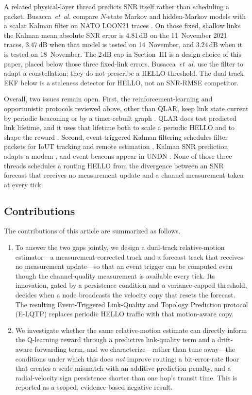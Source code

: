 A related physical-layer thread predicts SNR itself rather than
scheduling a packet.
Busacca~\emph{et~al.} compare $N$-state Markov and hidden-Markov
models with a scalar Kalman filter on NATO LOON21 traces
\cite{busacca2024snr}.
On those fixed, shallow links the Kalman mean absolute SNR error is
$4.81\,\mathrm{dB}$ on the 11~November 2021 traces,
$3.47\,\mathrm{dB}$ when that model is tested on 14~November, and
$3.24\,\mathrm{dB}$ when it is tested on 18~November.
The $2\,\mathrm{dB}$ cap in Section~III is a design choice of this
paper, placed below those three fixed-link errors.
Busacca~\emph{et~al.} use the filter to adapt a constellation;
they do not prescribe a HELLO threshold.
The dual-track EKF below is a staleness detector for HELLO, not an
SNR-RMSE competitor.

Overall, two issues remain open.
First, the reinforcement-learning and opportunistic protocols
reviewed above, other than QLAR, keep link state current by periodic
beaconing or by a timer-rebuilt graph
\cite{nandyala2023qtar,xu2025stgr,liu2026lqarp,zhu2024rcrp}.
QLAR does test predicted link lifetime, and it uses that lifetime
both to scale a periodic HELLO and to shape the reward
\cite{li2025qlar}.
Second, event-triggered Kalman filtering schedules filter packets
for IoUT tracking and remote estimation
\cite{li2026dse,sebastian2024eco,zhong2024tsp}, Kalman SNR
prediction adapts a modem \cite{busacca2024snr}, and event beacons
appear in UNDN \cite{wang2024push}.
None of those three threads schedules a routing HELLO from the
divergence between an SNR forecast that receives no measurement
update and a channel measurement taken at every tick.

\subsection{Contributions}
The contributions of this article are summarized as follows.

\begin{enumerate}
\item To answer the two gaps jointly, we design a dual-track
relative-motion estimator---a measurement-corrected track and a
forecast track that receives no measurement update---so that an event trigger can be
computed even though the channel-quality measurement is available
every tick.
Its innovation, gated by a persistence condition and a
variance-capped threshold, decides when a node broadcasts the
velocity copy that resets the forecast.
The resulting Event-Triggered Link-Quality and Topology Prediction
protocol (E-LQTP) replaces periodic HELLO traffic with that
motion-aware copy.

\item We investigate whether the same relative-motion estimate can
directly inform the Q-learning reward through a predictive
link-quality term and a drift-aware forwarding term, and we
characterize---rather than tune away---the conditions under which
this does \emph{not} improve routing: a bit-error-rate floor that
creates a scale mismatch with an additive prediction penalty, and a
radial-velocity sign persistence shorter than one hop's transit
time.
This is reported as a scoped, evidence-based negative result.
\end{enumerate}

